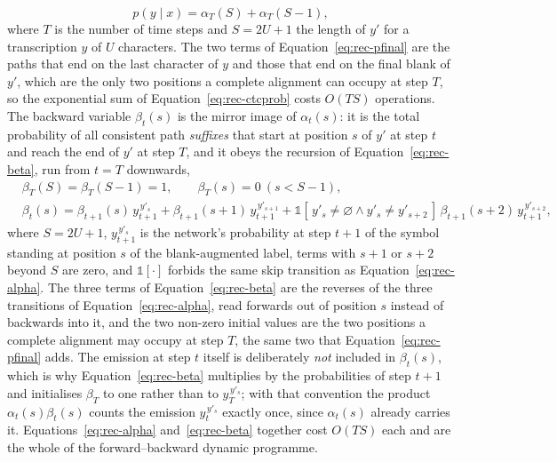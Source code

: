 \begin{equation}
p(y\mid x)=\alpha_T(S)+\alpha_T(S-1),
\label{eq:rec-pfinal}
\end{equation}
where $T$ is the number of time steps and $S=2U+1$ the length of $y'$ for a transcription $y$ of $U$ characters.
The two terms of Equation~\ref{eq:rec-pfinal} are the paths that end on the last character of $y$ and those that end on the final blank of $y'$, which are the only two positions a complete alignment can occupy at step $T$, so the exponential sum of Equation~\ref{eq:rec-ctcprob} costs $O(TS)$ operations.
The backward variable $\beta_t(s)$ is the mirror image of $\alpha_t(s)$: it is the total probability of all consistent path \emph{suffixes} that start at position $s$ of $y'$ at step $t$ and reach the end of $y'$ at step $T$, and it obeys the recursion of Equation~\ref{eq:rec-beta}, run from $t=T$ downwards,
\begin{equation}
\begin{split}&\beta_T(S)=\beta_T(S-1)=1,\qquad\beta_T(s)=0\ (s<S-1),\\
&\beta_t(s)=\beta_{t+1}(s)\,y_{t+1}^{\,y'_s}+\beta_{t+1}(s+1)\,y_{t+1}^{\,y'_{s+1}}+\mathbb 1[\,y'_s\ne\varnothing\wedge y'_s\ne y'_{s+2}\,]\,\beta_{t+1}(s+2)\,y_{t+1}^{\,y'_{s+2}},\end{split}
\label{eq:rec-beta}
\end{equation}
where $S=2U+1$, $y_{t+1}^{\,y'_s}$ is the network's probability at step $t+1$ of the symbol standing at position $s$ of the blank-augmented label, terms with $s+1$ or $s+2$ beyond $S$ are zero, and $\mathbb 1[\cdot]$ forbids the same skip transition as Equation~\ref{eq:rec-alpha}.
The three terms of Equation~\ref{eq:rec-beta} are the reverses of the three transitions of Equation~\ref{eq:rec-alpha}, read forwards out of position $s$ instead of backwards into it, and the two non-zero initial values are the two positions a complete alignment may occupy at step $T$, the same two that Equation~\ref{eq:rec-pfinal} adds.
The emission at step $t$ itself is deliberately \emph{not} included in $\beta_t(s)$, which is why Equation~\ref{eq:rec-beta} multiplies by the probabilities of step $t+1$ and initialises $\beta_T$ to one rather than to $y_T^{\,y'_s}$; with that convention the product $\alpha_t(s)\beta_t(s)$ counts the emission $y_t^{\,y'_s}$ exactly once, since $\alpha_t(s)$ already carries it.
Equations~\ref{eq:rec-alpha} and~\ref{eq:rec-beta} together cost $O(TS)$ each and are the whole of the forward--backward dynamic programme.

